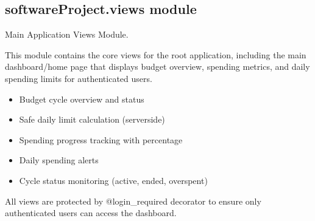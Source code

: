 \documentclass[letterpaper,10pt,english]{sphinxmanual}
\begin{document}
\subsection{softwareProject.views module}
\label{\detokenize{softwareProject:module-softwareProject.views}}\label{\detokenize{softwareProject:softwareproject-views-module}}
\sphinxAtStartPar
Main Application Views Module.

\sphinxAtStartPar
This module contains the core views for the root application, including
the main dashboard/home page that displays budget overview, spending
metrics, and daily spending limits for authenticated users.
\begin{description}
\begin{itemize}
\item {} 
\sphinxAtStartPar
Budget cycle overview and status

\item {} 
\sphinxAtStartPar
Safe daily limit calculation (server\sphinxhyphen{}side)

\item {} 
\sphinxAtStartPar
Spending progress tracking with percentage

\item {} 
\sphinxAtStartPar
Daily spending alerts

\item {} 
\sphinxAtStartPar
Cycle status monitoring (active, ended, overspent)

\end{itemize}

\end{description}

\sphinxAtStartPar
All views are protected by @login\_required decorator to ensure only
authenticated users can access the dashboard.
\end{document}
